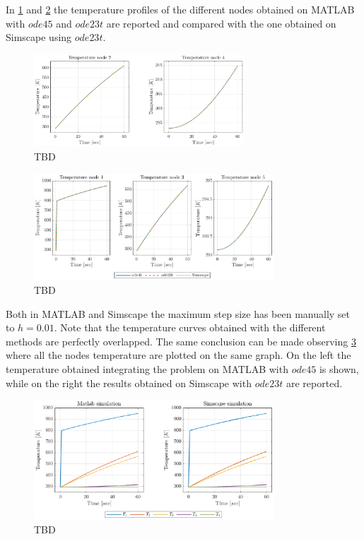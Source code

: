 \documentclass[11pt,a4paper,oneside]{article}
\begin{document}
In \cref{fig:ex1_tempKeyNodes} and \cref{fig:ex1_tempOtherNodes} the temperature profiles of the different nodes obtained on MATLAB with $ode45$ and $ode23t$ are reported and compared with the one obtained on Simscape using $ode23t$.
\begin{figure}[htb]
    \centering
    \includegraphics*[width=0.7\textwidth, keepaspectratio]{Figures/ex1_tempKeyNodes.eps}
    \caption[]{\label{fig:ex1_tempKeyNodes} TBD}
\end{figure}
\begin{figure}[htb]
    \centering
    \includegraphics*[width=0.8\textwidth, keepaspectratio]{Figures/ex1_tempOtherNodes.eps}
    \caption[]{\label{fig:ex1_tempOtherNodes} TBD}
\end{figure}

Both in MATLAB and Simscape the maximum step size has been manually set to $h=0.01$.
Note that the temperature curves obtained with the different methods are perfectly overlapped.
The same conclusion can be made observing \cref{fig:ex1_tempCompare} where all the nodes temperature are plotted on the same graph.
On the left the temperature obtained integrating the problem on MATLAB with $ode45$ is shown, while on the right the results obtained on Simscape with $ode23t$ are reported.
\begin{figure}[htb]
    \centering
    \includegraphics*[width=0.8\textwidth, keepaspectratio]{Figures/ex1_tempCompare.eps}
    \caption[]{\label{fig:ex1_tempCompare} TBD}
\end{figure}
\end{document}
